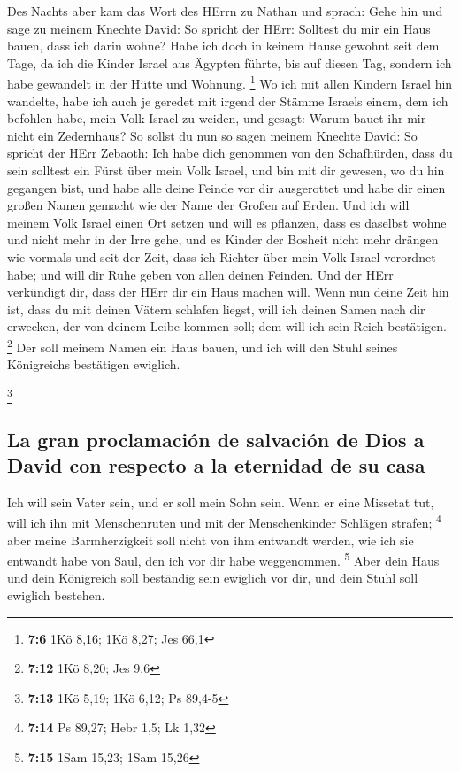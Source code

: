  Des Nachts aber kam das Wort des HErrn zu Nathan und
sprach:  Gehe hin und sage zu meinem Knechte David: So
spricht der HErr: Solltest du mir ein Haus bauen, dass ich darin wohne?
 Habe ich doch in keinem Hause gewohnt seit dem Tage, da
ich die Kinder Israel aus Ägypten führte, bis auf diesen Tag, sondern
ich habe gewandelt in der Hütte und Wohnung. \footnote{\textbf{7:6} 1Kö
  8,16; 1Kö 8,27; Jes 66,1}  Wo ich mit allen Kindern
Israel hin wandelte, habe ich auch je geredet mit irgend der Stämme
Israels einem, dem ich befohlen habe, mein Volk Israel zu weiden, und
gesagt: Warum bauet ihr mir nicht ein Zedernhaus?  So
sollst du nun so sagen meinem Knechte David: So spricht der HErr
Zebaoth: Ich habe dich genommen von den Schafhürden, dass du sein
solltest ein Fürst über mein Volk Israel,  und bin mit dir
gewesen, wo du hin gegangen bist, und habe alle deine Feinde vor dir
ausgerottet und habe dir einen großen Namen gemacht wie der Name der
Großen auf Erden.  Und ich will meinem Volk Israel einen
Ort setzen und will es pflanzen, dass es daselbst wohne und nicht mehr
in der Irre gehe, und es Kinder der Bosheit nicht mehr drängen wie
vormals und seit der Zeit, dass ich Richter über mein Volk Israel
verordnet habe;  und will dir Ruhe geben von allen deinen
Feinden. Und der HErr verkündigt dir, dass der HErr dir ein Haus machen
will.  Wenn nun deine Zeit hin ist, dass du mit deinen
Vätern schlafen liegst, will ich deinen Samen nach dir erwecken, der von
deinem Leibe kommen soll; dem will ich sein Reich bestätigen.
\footnote{\textbf{7:12} 1Kö 8,20; Jes 9,6}  Der soll
meinem Namen ein Haus bauen, und ich will den Stuhl seines Königreichs
bestätigen ewiglich.

\footnote{\textbf{7:13} 1Kö 5,19; 1Kö 6,12; Ps 89,4-5}

\hypertarget{la-gran-proclamaciuxf3n-de-salvaciuxf3n-de-dios-a-david-con-respecto-a-la-eternidad-de-su-casa}{%
\subsection{La gran proclamación de salvación de Dios a David con
respecto a la eternidad de su
casa}\label{la-gran-proclamaciuxf3n-de-salvaciuxf3n-de-dios-a-david-con-respecto-a-la-eternidad-de-su-casa}}

 Ich will sein Vater sein, und er soll mein Sohn sein.
Wenn er eine Missetat tut, will ich ihn mit Menschenruten und mit der
Menschenkinder Schlägen strafen; \footnote{\textbf{7:14} Ps 89,27; Hebr
  1,5; Lk 1,32}  aber meine Barmherzigkeit soll nicht von
ihm entwandt werden, wie ich sie entwandt habe von Saul, den ich vor dir
habe weggenommen. \footnote{\textbf{7:15} 1Sam 15,23; 1Sam 15,26}
 Aber dein Haus und dein Königreich soll beständig sein
ewiglich vor dir, und dein Stuhl soll ewiglich bestehen.

